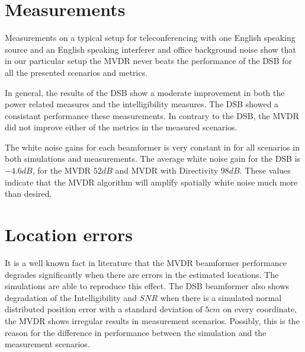 
\section{Measurements}
\label{sec:conc:meas}
Measurements on a typical setup for teleconferencing with one English speaking source and an English speaking interferer and office background noise show that in our particular setup the MVDR never beats the performance of the DSB for all the presented scenarios and metrics. 

In general, the results of the DSB show a moderate improvement in both the power related measures and the intelligibility measures. The DSB showed a consistant performance these measurements. In contrary to the DSB, the MVDR did not improve either of the metrics in the measured scenarios. 

The white noise gains for each beamformer is very constant in for all scenarios in both simulations and measurements. The average white noise gain for the DSB is $-4.6 dB$, for the MVDR $52dB$ and MVDR with Directivity $98dB$. These values indicate that the MVDR algorithm will amplify spatially white noise much more than desired. 




\section{Location errors}
\label{sec:conc:loc}
It is a well known fact in literature that the MVDR beamformer performance degrades significantly when there are errors in the estimated locations. The simulations are able to reproduce this effect. The DSB beamformer also shows degradation of the Intelligibility and $SNR$ when there is a simulated normal distributed position error with a standard deviation of $5 cm$ on every coordinate, the MVDR shows irregular results in measurement scenarios. Possibly, this is the reason for the difference in performance between the simulation and the measurement scenarios.

